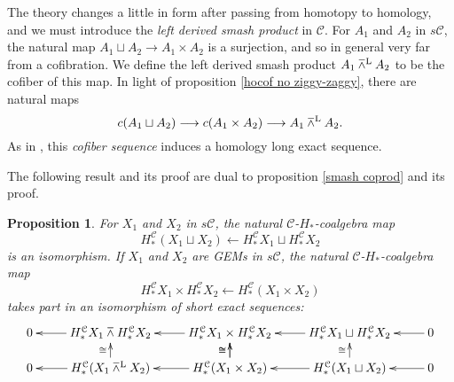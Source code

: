 \documentclass[11pt]{amsart}
\theoremstyle{plain}
\newtheorem{prop}[thm]{Proposition}
\theoremstyle{definition}
\renewcommand{\to}{\longrightarrow}
\newcommand{\from}{\longleftarrow}
\newcommand{\calC}{\mathcal{C}}
\newcommand{\calc}{\mathcal{C}}
\theoremstyle{plain}
\newcommand{\smashprod}{\barwedge}%
\newcommand{\Lsmashprod}{\barwedge^\textup{L}}%
\begin{document}
\begin{CPiAlgs and CHalgs}
The theory changes a little in form after passing from homotopy to homology, and we must introduce the \emph{left derived smash product} in $\calc$. For $A_1$ and $A_2$ in $s\calc$, the natural map $A_1\sqcup A_2\to A_1\times A_2$ is a surjection, and so in general very far from a cofibration. We define the left derived smash product $A_1\Lsmashprod A_2$ to be the cofiber of this map.
In light of proposition \ref{hocof no ziggy-zaggy}, there are natural maps
\[c(A_1\sqcup A_2)\to c(A_1\times A_2)\to A_1\Lsmashprod A_2.\]
As in \cite[Proposition 4.6]{MR1089001}, this \emph{cofiber sequence} induces  a homology long exact sequence.
%
%

The following result and its proof are dual to proposition \ref{smash coprod} and its proof.
\begin{prop}\label{smash prod}
For $X_1$ and $X_2$ in $s\calc$, the natural $\calC$-$H_*$-coalgebra map
\[H^\calc_*(X_1\sqcup X_2)\from H^\calc_* X_1\sqcup H^\calc_* X_2\]
 is an isomorphism. If $X_1$ and $X_2$ are GEMs in $s\calc$, the natural $\calC$-$H_*$-coalgebra map 
\[H^\calc_* X_1\times H^\calc_* X_2\from H^\calc_*(X_1\times X_2)\]
takes part in an isomorphism of short exact sequences:
\[\xymatrix@R=4mm{
0\ar[r];[]&%
H^\calc_* X_1\smashprod H^\calc_* X_2
\ar[r];[]\ar[d];[]^-{\cong}
&%
H^\calc_* X_1\times H^\calc_* X_2
\ar[r];[]
\ar[d];[]^-{\cong}\ar[d];[]^-{\cong}
&%
H^\calc_* X_1\sqcup H^\calc_* X_2
\ar[r];[]
\ar[d];[]^-{\cong}
&%
0\\%
0\ar[r];[]&%
H^\calc_* (X_1\Lsmashprod X_2)
\ar[r];[]
&%
H^\calc_* (X_1\times X_2)
\ar[r];[]
&%
H^\calc_* (X_1\sqcup X_2)
\ar[r];[]&0
}\]
\end{prop}






\end{CPiAlgs and CHalgs}
\end{document}

